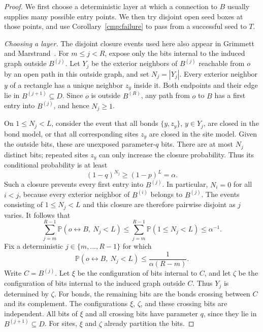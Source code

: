 \documentclass[11pt]{article}
\theoremstyle{definition}
\theoremstyle{remark}
\numberwithin{equation}{section}
\begin{document}
\begin{proof}
We first choose a deterministic layer at which a connection to $B$
usually supplies many possible entry points. We then try disjoint open
seed boxes at those points, and use Corollary~\ref{cmp:failure} to pass
from a successful seed to $T$.

\emph{Choosing a layer.}
The disjoint closure events used here also appear in Grimmett and
Marstrand~\cite[Section~3, Lemma~3]{GrimmettMarstrand1990}.
For $m\le j<R$, expose only the bits internal to the induced graph
outside $B^{(j)}$. Let $Y_j$ be the exterior neighbors of $B^{(j)}$
reachable from $o$ by an open path in this outside graph, and set
$N_j=|Y_j|$.
Every exterior neighbor $y$ of a rectangle has a unique neighbor
$z_y$ inside it. Both endpoints and their edge lie in
$B^{(j+1)}\subseteq D$.
Since $o$ is outside $B^{(R)}$, any path from $o$ to $B$ has a first
entry into $B^{(j)}$, and hence $N_j\ge1$.

On $1\le N_j<L$, consider the event that all bonds $\{y,z_y\}$,
$y\in Y_j$, are closed in the bond model, or that all corresponding
sites $z_y$ are closed in the site model.
Given the outside bits, these are unexposed parameter-$q$ bits.
There are at most $N_j$ distinct bits; repeated sites $z_y$ can only
increase the closure probability. Thus its conditional probability
is at least
\[
 (1-q)^{N_j}\ge (1-p)^L=\alpha.
\]
Such a closure prevents every first entry into $B^{(j)}$.
In particular, $N_i=0$ for all $i<j$, because every exterior neighbor
of $B^{(i)}$ belongs to $B^{(j)}$.
The events consisting of $1\le N_j<L$ and this closure are therefore
pairwise disjoint as $j$ varies. It follows that
\[
 \sum_{j=m}^{R-1}\mathbb P(o\leftrightarrow B,\ N_j<L)
 \le \sum_{j=m}^{R-1}\mathbb P(1\le N_j<L)
 \le \alpha^{-1}.
\]
Fix a deterministic $j\in\{m,\ldots,R-1\}$ for which
\begin{equation}
 \mathbb P(o\leftrightarrow B,\ N_j<L)
 \le \frac{1}{\alpha(R-m)}.
 \label{ext:layer}
\end{equation}
Write $C=B^{(j)}$. Let $\xi$ be the configuration of bits internal
to $C$, and let $\zeta$ be the configuration of bits internal to the
induced graph outside $C$. Thus $Y_j$ is determined by $\zeta$.
For bonds, the remaining bits are the bonds crossing between $C$
and its complement. The configurations $\xi$, $\zeta$, and these
crossing bits are independent. All bits of $\xi$ and all crossing
bits have parameter $q$, since they lie in $B^{(j+1)}\subseteq D$.
For sites, $\xi$ and $\zeta$ already partition the bits.


\end{proof}
\end{document}
